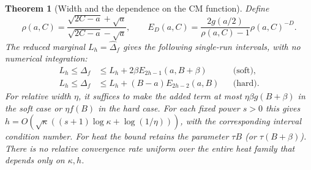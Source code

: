 \documentclass[11pt]{article}
\newtheorem{theorem}{Theorem}
\begin{document}
\begin{theorem}[Width and the dependence on the CM function]\label{thm:width}
Define
\[
 \rho(a,C)=\frac{\sqrt{2C-a}+\sqrt a}{\sqrt{2C-a}-\sqrt a},\qquad
 E_D(a,C)=\frac{2g(a/2)}{\rho(a,C)-1}\rho(a,C)^{-D}.
\]
The reduced marginal $L_h=\widehat\Delta_f$ gives the following
single-run intervals, with no numerical integration:
\begin{align}
 L_h\leq\Delta_f&\leq L_h+2\beta E_{2h-1}(a,B+\beta)
                 &&\text{(soft)},\label{eq:widthsoft}\\
 L_h\leq\Delta_f&\leq L_h+(B-a)E_{2h-2}(a,B)
                 &&\text{(hard)}.\label{eq:widthhard}
\end{align}
For relative width $\eta$, it suffices to make the added term at most
$\eta\beta g(B+\beta)$ in the soft case or $\eta f(B)$ in the hard
case. For each fixed power $s>0$ this gives
$h=O(\sqrt\kappa((s+1)\log\kappa+\log(1/\eta)))$, with the
corresponding interval condition number. For heat the bound retains
the parameter $\tau B$ (or $\tau(B+\beta)$).
There is no relative convergence rate uniform over the entire heat
family that depends only on $\kappa,h$.
\end{theorem}
\end{document}
